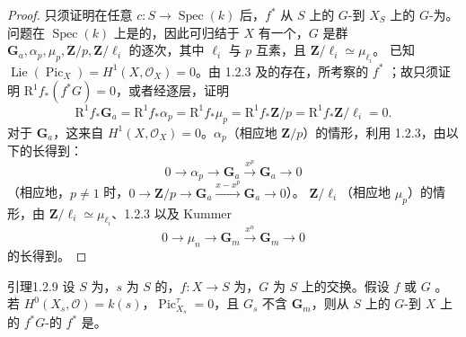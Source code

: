 \begin{proof}
只须证明在任意 $c:S\to\operatorname{Spec}(k)$ 后，$f^*$ 从 $S$ 上的 $G$-到 $X_S$ 上的 $G$-为。问题在 $\operatorname{Spec}(k)$ 上是的，因此可归结于 $X$ 有一个，$G$ 是群 $\mathbf G_a,\alpha_p,\mu_p,\mathbf Z/p,\mathbf Z/\ell_i$ 的逐次，其中 $\ell_i$ 与 $p$ 互素，且 $\mathbf Z/\ell_i\simeq\mu_{\ell_i}$。
已知 $\operatorname{Lie}(\operatorname{Pic}_X)=H^1(X,\mathscr O_X)=0$。由 1.2.3 及的存在，所考察的 $f^*$ ；故只须证明 $\mathrm R^1f_*(f^*G)=0$，或者经逐层，证明
\[\mathrm R^1f_*\mathbf G_a=\mathrm R^1f_*\alpha_p=\mathrm R^1f_*\mu_p=\mathrm R^1f_*\mathbf Z/p=\mathrm R^1f_*\mathbf Z/\ell_i=0.\]
对于 $\mathbf G_a$，这来自 $H^1(X,\mathscr O_X)=0$。$\alpha_p$（相应地 $\mathbf Z/p$）的情形，利用 1.2.3，由以下的长得到：
\[0\longrightarrow\alpha_p\longrightarrow\mathbf G_a\xrightarrow{x^p}\mathbf G_a\longrightarrow0\]
（相应地，$p\ne1$ 时，$0\to\mathbf Z/p\to\mathbf G_a\xrightarrow{x-x^p}\mathbf G_a\to0$）。
$\mathbf Z/\ell_i$（相应地 $\mu_p$）的情形，由 $\mathbf Z/\ell_i\simeq\mu_{\ell_i}$、1.2.3 以及 Kummer 
\[0\longrightarrow\mu_n\longrightarrow\mathbf G_m\xrightarrow{x^n}\mathbf G_m\longrightarrow0\]
的长得到。
\end{proof}
\begin{SGAresult}{引理}{1.2.9}
设 $S$ 为，$s$ 为 $S$ 的，$f:X\to S$ 为，$G$ 为 $S$ 上的交换。假设 $f$ 或 $G$ 。若 $H^0(X_s,\mathscr O)=k(s)$，$\operatorname{Pic}^\tau_{X_s}=0$，且 $G_s$ 不含 $\mathbf G_m$，则从 $S$ 上的 $G$-到 $X$ 上的 $f^*G$-的 $f^*$ 是。
\end{SGAresult}
